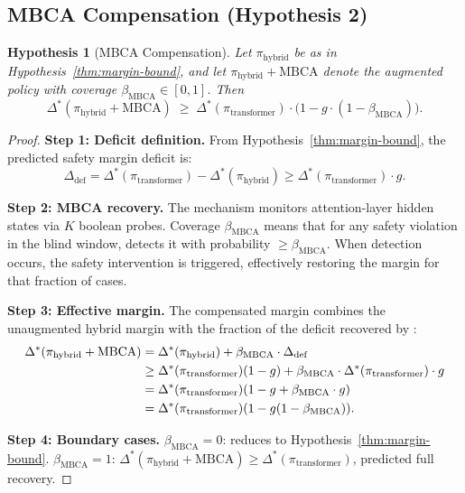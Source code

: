 \documentclass{article}
\newtheorem{theorem}{Hypothesis}[section]
\newcommand{\deltaStar}{\Delta^{*}}
\newcommand{\piHybrid}{\pi_{\mathrm{hybrid}}}
\newcommand{\piTrans}{\pi_{\mathrm{transformer}}}
\newcommand{\MBCA}{\mathrm{MBCA}}
\newcommand{\betaMBCA}{\beta_{\MBCA}}
\begin{document}
\subsection{MBCA Compensation (Hypothesis 2)}
\label{sec:mbca-theorem}

\begin{theorem}[MBCA Compensation]
\label{thm:mbca-comp}
Let $\piHybrid$ be as in Hypothesis~\ref{thm:margin-bound}, and let $\piHybrid + \MBCA$ denote the augmented policy with coverage $\betaMBCA \in [0,1]$. Then
\begin{equation}
    \deltaStar(\piHybrid + \MBCA) \;\geq\; \deltaStar(\piTrans) \cdot \bigl(1 - g \cdot (1 - \betaMBCA)\bigr).
    \label{eq:mbca-comp-formal}
\end{equation}
\end{theorem}

\begin{proof}
\noindent\textbf{Step 1: Deficit definition.}
From Hypothesis~\ref{thm:margin-bound}, the predicted safety margin deficit is:
\begin{equation}
    \Delta_{\mathrm{def}} = \deltaStar(\piTrans) - \deltaStar(\piHybrid) \geq \deltaStar(\piTrans) \cdot g.
\end{equation}

\noindent\textbf{Step 2: MBCA recovery.}
The \MBCA{} mechanism monitors attention-layer hidden states via $K$ boolean probes. Coverage $\betaMBCA$ means that for any safety violation in the blind window, \MBCA{} detects it with probability $\geq \betaMBCA$. When detection occurs, the safety intervention is triggered, effectively restoring the margin for that fraction of cases.

\noindent\textbf{Step 3: Effective margin.}
The compensated margin combines the unaugmented hybrid margin with the fraction of the deficit recovered by \MBCA{}:
\begin{align}
    \deltaStar(\piHybrid + \MBCA) &= \deltaStar(\piHybrid) + \betaMBCA \cdot \Delta_{\mathrm{def}} \notag\\
    &\geq \deltaStar(\piTrans)(1-g) + \betaMBCA \cdot \deltaStar(\piTrans) \cdot g \notag\\
    &= \deltaStar(\piTrans)(1 - g + \betaMBCA \cdot g) \notag\\
    &= \deltaStar(\piTrans)(1 - g(1 - \betaMBCA)).
\end{align}

\noindent\textbf{Step 4: Boundary cases.}
$\betaMBCA = 0$: reduces to Hypothesis~\ref{thm:margin-bound}. $\betaMBCA = 1$: $\deltaStar(\piHybrid + \MBCA) \geq \deltaStar(\piTrans)$, predicted full recovery.
\end{proof}
\end{document}

